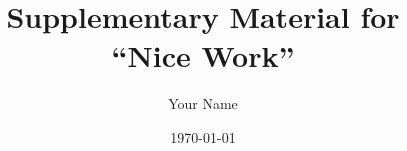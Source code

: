 \documentclass[a4paper]{article}
\theoremstyle{definition}
\begin{document}
\title{Supplementary Material for \\ ``Nice Work''}
\author{Your Name}
\date{\today}

\maketitle

\tableofcontents

\listoftheorems




\end{document}
